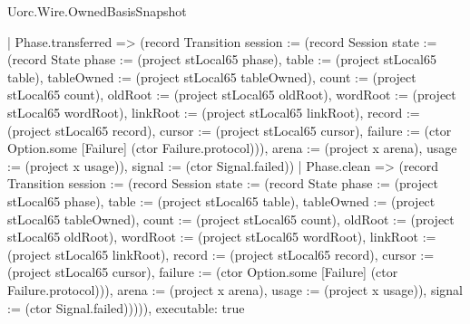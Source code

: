 \begin{lexlean}{Uorc.Wire.OwnedBasisSnapshot}
\begin{semanticmodule}
{      | Phase.transferred => (record Transition {session := (record Session {state := (record State {phase := (project stLocal65 phase), table := (project stLocal65 table), tableOwned := (project stLocal65 tableOwned), count := (project stLocal65 count), oldRoot := (project stLocal65 oldRoot), wordRoot := (project stLocal65 wordRoot), linkRoot := (project stLocal65 linkRoot), record := (project stLocal65 record), cursor := (project stLocal65 cursor), failure := (ctor Option.some [Failure] (ctor Failure.protocol))}), arena := (project x arena), usage := (project x usage)}), signal := (ctor Signal.failed)})
      | Phase.clean => (record Transition {session := (record Session {state := (record State {phase := (project stLocal65 phase), table := (project stLocal65 table), tableOwned := (project stLocal65 tableOwned), count := (project stLocal65 count), oldRoot := (project stLocal65 oldRoot), wordRoot := (project stLocal65 wordRoot), linkRoot := (project stLocal65 linkRoot), record := (project stLocal65 record), cursor := (project stLocal65 cursor), failure := (ctor Option.some [Failure] (ctor Failure.protocol))}), arena := (project x arena), usage := (project x usage)}), signal := (ctor Signal.failed)})))),
  executable: true
}


\end{semanticmodule}
\end{lexlean}
